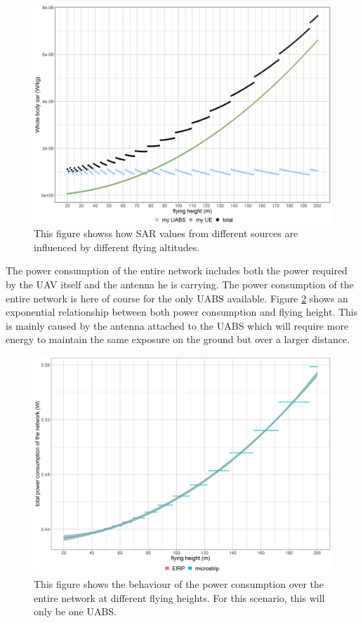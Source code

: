 \begin{figure}[]
  \includegraphics[width=\textwidth]{../results/s1/fhvssar.png}
  \caption{This figure showss how SAR values from different sources are influenced by different flying altitudes.}
  \label{fig:s1_fhsar}
\end{figure}

The power consumption of the entire network includes both the power required by the \gls{UAV} itself and the antenna he is carrying.
The power consumption of the entire network is here of course for the only \gls{UABS} available. Figure \ref{fig:fhvspc} shows an 
exponential relationship between both power consumption and flying height. This  is mainly caused by the antenna 
attached to the \gls{UABS} which will require more energy to maintain the same exposure on the ground but over a larger distance.

\begin{figure}[t]
  \centering
  \includegraphics[width=\textwidth]{../results/s1/fhvspc.png}
  \caption{This figure shows the behaviour of the power consumption over the entire network at different flying  heights.
  For this scenario, this will only be one \gls{UABS}.}
  \label{fig:fhvspc}
\end{figure}

